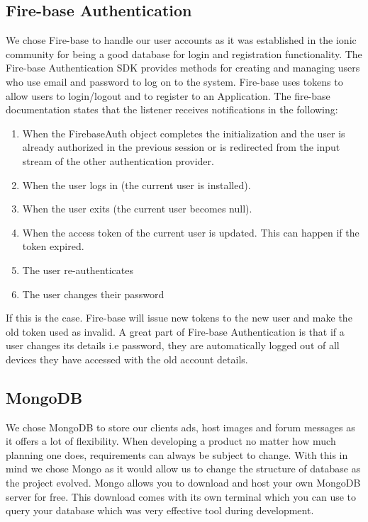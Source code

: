 \documentclass[12pt,a4paper,oneside,openany]{book}
\begin{document}
\subsection{Fire-base Authentication}
We chose Fire-base to handle our user accounts as it was established in the ionic community for being a good database for login and registration functionality. The Fire-base Authentication SDK provides methods for creating and managing users who use email and password to log on to the system. Fire-base uses tokens to allow users to login/logout and to register to an Application. The fire-base documentation states that the listener receives notifications in the following: 
\begin{enumerate}
    \item When the FirebaseAuth object completes the initialization and the user is already authorized in the previous session or is redirected from the input stream of the other authentication provider.
    \item When the user logs in (the current user is installed).
    \item When the user exits (the current user becomes null).
    \item When the access token of the current user is updated. This can happen if the token expired.
    \item The user re-authenticates
    \item The user changes their password
\end{enumerate}

If this is the case. Fire-base will issue new tokens to the new user and make the old token used as invalid. A great part of Fire-base Authentication is that if a user changes its details i.e password, they are automatically logged out of all devices they have accessed with the old account details.

\subsection{MongoDB}
We chose MongoDB to store our clients ads, host images and forum messages as it offers a lot of flexibility. When developing a product no matter how much planning one does, requirements can always be subject to change. With this in mind we chose Mongo as it would allow us to change the structure of database as the project evolved. Mongo allows you to download and host your own MongoDB server for free. This download comes with its own terminal which you can use to query your database which was very effective tool during development.
\end{document}
